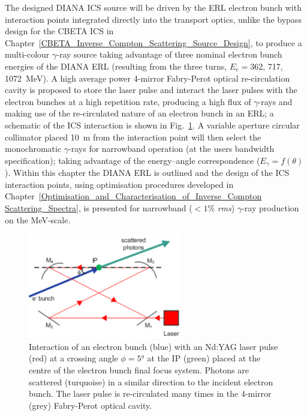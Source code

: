 \documentclass[../main.tex]{subfiles}
\begin{document}
The designed DIANA ICS source will be driven by the ERL electron bunch with interaction points integrated directly into the transport optics, unlike the bypass design for the CBETA ICS in Chapter~\ref{CBETA_Inverse_Compton_Scattering_Source_Design}, to produce a multi-colour $\gamma$-ray source taking advantage of three nominal electron bunch energies of the DIANA ERL (resulting from the three turns, $E_{e}=$362, 717, 1072~\si{\mega\electronvolt}). A high average power 4-mirror Fabry-Perot optical re-circulation cavity is proposed to store the laser pulse and interact the laser pulses with the electron bunches at a high repetition rate, producing a high flux of $\gamma$-rays and making use of the re-circulated nature of an electron bunch in an ERL; a schematic of the ICS interaction is shown in Fig.~\ref{fig:DIANA_interaction}. A variable aperture circular collimator placed 10~\si{\meter} from the interaction point will then select the monochromatic $\gamma$-rays for narrowband operation (at the users bandwidth specification); taking advantage of the energy--angle correspondence ($E_{\gamma}=f\left(\theta\right)$). Within this chapter the DIANA ERL is outlined and the design of the ICS interaction points, using optimisation procedures developed in Chapter~\ref{Optimisation_and_Characterisation_of_Inverse_Compton Scattering_Spectra}, is presented for narrowband ($< 1$\% \textit{rms}) $\gamma$-ray production on the \si{\mega\electronvolt}-scale. 
\begin{figure}[!h]
\centering
\includegraphics[width=0.6\textwidth]{Figures/DIANA_Inverse_Compton_Source_Design/DIANA_interaction_fixed.pdf}
\caption{Interaction of an electron bunch (blue) with an Nd:YAG laser pulse (red) at a crossing angle $\phi=5$\si{\degree} at the IP (green) placed at the centre of the electron bunch final focus system. Photons are scattered (turquoise) in a similar direction to the incident electron bunch. The laser pulse is re-circulated many times in the 4-mirror (grey) Fabry-Perot optical cavity.    }
\label{fig:DIANA_interaction}
\end{figure}
\end{document}
